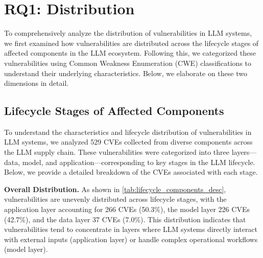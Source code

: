 \section{RQ1: Distribution}
To comprehensively analyze the distribution of vulnerabilities in LLM systems, we first examined how vulnerabilities are distributed across the lifecycle stages of affected components in the LLM ecosystem. Following this, we categorized these vulnerabilities using Common Weakness Enumeration (CWE) classifications to understand their underlying characteristics. Below, we elaborate on these two dimensions in detail.

\subsection{Lifecycle Stages of Affected Components}
To understand the characteristics and lifecycle distribution of vulnerabilities in LLM systems, we analyzed 529 CVEs collected from diverse components across the LLM supply chain. These vulnerabilities were categorized into three layers—data, model, and application—corresponding to key stages in the LLM lifecycle. Below, we provide a detailed breakdown of the CVEs associated with each stage.

\noindent \textbf{Overall Distribution.}
As shown in \autoref{tab:lifecycle_components_desc}, vulnerabilities are unevenly distributed across lifecycle stages, with the application layer accounting for 266 CVEs (50.3\%), the model layer 226 CVEs (42.7\%), and the data layer 37 CVEs (7.0\%). This distribution indicates that vulnerabilities tend to concentrate in layers where LLM systems directly interact with external inputs (application layer) or handle complex operational workflows (model layer).

